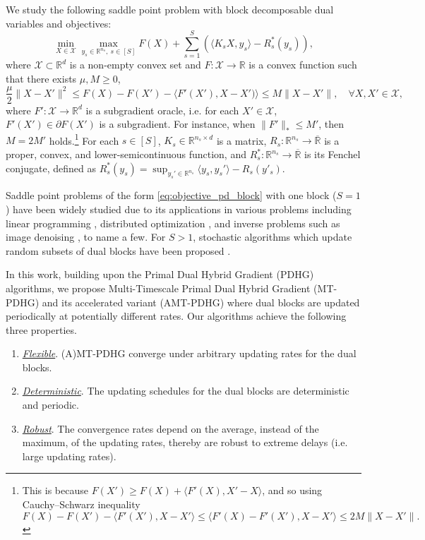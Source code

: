 \documentclass[10pt]{article}
\newcommand{\mc}{\mathcal}
\newcommand{\R}{\mathbb{R}}
\begin{document}
We study the following saddle point problem with block decomposable dual variables and objectives:
\begin{equation}\label{eq:objective_pd_block}\tag{$\mc P_b$}
    \min_{X\in \mc X} \max_{y_s\in \R^{n_s},~s\in [S]} F(X)+\sum_{s=1}^S\left( \langle K_sX,y_s\rangle  -  R_s^*(y_s)\right),
\end{equation}
where $\mc X\subset \R^{d}$ is a non-empty convex set and $F:\mc X\to \R$ is a convex function such that there exists $\mu,M\geq 0$, 
\begin{equation}\label{eq:prop-F}
    \frac{\mu}{2}\|X-X'\|^2\leq F(X) - F(X')-\langle F' (X'),X-X')\rangle\leq M\|X-X'\|,\quad\forall X,X'\in \mc X,
\end{equation}
where $F':\mc X\to \R^{d}$ is a subgradient oracle, i.e. for each $X'\in \mc X$, $F'(X')\in \partial F(X')$ is a subgradient. For instance, when $\|F'\|_*\leq M'$, then $M = 2M'$ holds.\footnote{This is because $F(X') \geq  F(X)+ \langle F'(X), X'-X\rangle$, and so using Cauchy–Schwarz inequality 
\begin{displaymath}
    F(X) - F(X') - \langle F'(X'), X-X'\rangle \leq \langle F'(X) - F'(X'), X-X'\rangle \leq 2M \|X-X'\|.
\end{displaymath}} For each $s\in [S]$, $K_s\in \R^{n_s\times d}$ is a matrix, $R_s:\R^{n_s}\to \overline{\R}$ is a proper, convex, and lower-semicontinuous function, and $R_s^*:\R^{n_s}\to \overline{\R}$ is its Fenchel conjugate, defined as $R_s^*(y_s) = \sup_{y_s'\in \R^{n_s}} \langle y_s,y_s'\rangle -R_s(y'_s)$. 

Saddle point problems of the form \eqref{eq:objective_pd_block} with one block ($S=1$) have been widely studied due to its applications in various problems including linear programming \cite{applegate_faster_2023}, distributed optimization \cite{lan_communication-efficient_2020}, and inverse problems such as image denoising \cite{chambolle_ergodic_2016,chambolle_first-order_2011}, to name a few. For $S>1$, stochastic algorithms which update random subsets of dual blocks have been proposed \cite{Chambolle2018Stochastic,ShaiTong2013}. 

In this work, building upon the Primal Dual Hybrid Gradient (PDHG) algorithms\cite{chambolle_ergodic_2016,chambolle_first-order_2011}, we propose Multi-Timescale Primal Dual Hybrid Gradient (MT-PDHG) and its accelerated variant (AMT-PDHG) where dual blocks are updated periodically at potentially 
different rates. Our algorithms achieve the following three properties.
\begin{enumerate}
    \item \underline{\textit{Flexible}}. (A)MT-PDHG converge under arbitrary updating rates for the dual blocks. 
    \item \underline{\textit{Deterministic}}. The updating schedules for the dual blocks are deterministic and periodic. 
    \item \underline{\textit{Robust}}. The convergence rates depend on the average, instead of the maximum, of the updating rates, thereby are robust to extreme delays (i.e. large updating rates). 
\end{enumerate}
\end{document}
